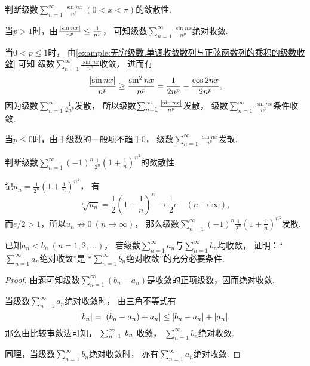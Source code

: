 \begin{example}
判断级数\(\sum_{n=1}^\infty \frac{\sin nx}{n^p}\ (0<x<\pi)\)的敛散性.
\begin{solution}
当\(p>1\)时，由\(\frac{\abs{\sin nx}}{n^p} \leq \frac1{n^p}\)，
可知级数\(\sum_{n=1}^\infty \frac{\sin nx}{n^p}\)绝对收敛.

当\(0<p\leq1\)时，
由\cref{example:无穷级数.单调收敛数列与正弦函数列的乘积的级数收敛} 可知
级数\(\sum_{n=1}^\infty \frac{\sin nx}{n^p}\)收敛，
进而有\begin{equation*}
	\frac{\abs{\sin nx}}{n^p}
	\geq \frac{\sin^2nx}{n^p}
	= \frac1{2n^p} - \frac{\cos2nx}{2n^p},
\end{equation*}
因为级数\(\sum_{n=1}^\infty \frac1{2n^p}\)发散，
所以级数\(\sum_{n=1}^\infty \frac{\abs{\sin nx}}{n^p}\)发散，
级数\(\sum_{n=1}^\infty \frac{\sin nx}{n^p}\)条件收敛.

当\(p\leq0\)时，由于级数的一般项不趋于\(0\)，
级数\(\sum_{n=1}^\infty \frac{\sin nx}{n^p}\)发散.
\end{solution}
\end{example}

\begin{example}
判断级数\(\sum_{n=1}^\infty (-1)^n \frac1{2^n} \left(1+\frac1n\right)^{n^2}\)的敛散性.
\begin{solution}
记\(u_n = \frac1{2^n} \left(1+\frac1n\right)^{n^2}\)，
有\begin{equation*}
	\sqrt[n]{u_n}
	= \frac12 \left(1+\frac1n\right)^n
	\to \frac12 e \quad(n\to\infty),
\end{equation*}
而\(e/2>1\)，所以\(u_n \not\to 0\ (n\to\infty)\)，
那么级数\(\sum_{n=1}^\infty (-1)^n \frac1{2^n} \left(1+\frac1n\right)^{n^2}\)发散.
\end{solution}
\end{example}

\begin{example}
已知\(a_n < b_n\ (n=1,2,\dotsc)\)，
若级数\(\sum_{n=1}^\infty a_n\)与\(\sum_{n=1}^\infty b_n\)均收敛，
证明：“\(\sum_{n=1}^\infty a_n\)绝对收敛”是
“\(\sum_{n=1}^\infty b_n\)绝对收敛”的充分必要条件.
\begin{proof}
由题可知级数\(\sum_{n=1}^\infty (b_n - a_n)\)是收敛的正项级数，因而绝对收敛.

当级数\(\sum_{n=1}^\infty a_n\)绝对收敛时，
由\hyperref[theorem:不等式.三角不等式1]{三角不等式}有\begin{equation*}
	\abs{b_n} = \abs{(b_n - a_n) + a_n}
	\leq \abs{b_n - a_n} + \abs{a_n},
\end{equation*}
那么由\hyperref[theorem:无穷级数.正项级数的比较审敛法]{比较审敛法}可知，
\(\sum_{n=1}^\infty \abs{b_n}\)收敛，
\(\sum_{n=1}^\infty b_n\)绝对收敛.

同理，当级数\(\sum_{n=1}^\infty b_n\)绝对收敛时，
亦有\(\sum_{n=1}^\infty a_n\)绝对收敛.
\end{proof}
\end{example}

